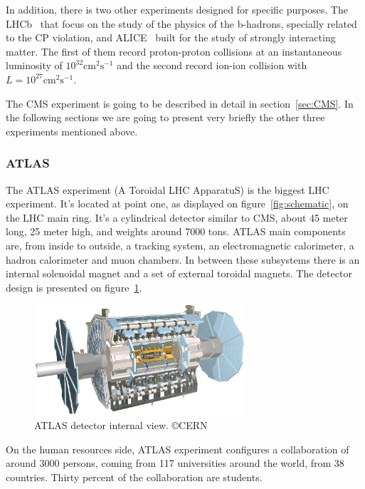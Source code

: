 In addition, there is two other experiments designed for specific purposes. The LHCb~\cite{Alves:2008zz} that focus on the study of the physics of the b-hadrons, specially related to the CP violation, and ALICE~\cite{Cortese:879894} built for the study of strongly interacting matter. The first of them record proton-proton collisions at an instantaneous luminosity of $10^{32}\text{cm}^{2}\text{s}^{-1}$ and the second record ion-ion collision with $L = 10^{27}\text{cm}^{2}\text{s}^{-1}$.

The CMS experiment is going to be described in detail in section~\ref{sec:CMS}. In the following sections we are going to present very briefly the other three experiments mentioned above. 

\subsubsection{ATLAS}
\label{sec:atlas}

The ATLAS experiment (A Toroidal LHC ApparatuS) is the biggest LHC experiment. It's located at point one, as displayed on figure~\ref{fig:schematic}, on the LHC main ring. It's a cylindrical detector similar to CMS, about 45 meter long, 25 meter high, and weights around 7000 tons. ATLAS main components are, from inside to outside, a tracking system, an electromagnetic calorimeter, a hadron calorimeter and muon chambers. In between these subsystems there is an internal solenoidal magnet and a set of external toroidal magnets. The detector design is presented on figure~\ref{fig:atlasdet}.

\begin{figure}[!Hhtbp]
  \begin{center}
    \includegraphics[width=0.7\textwidth]{figs/atlas_lg.jpg}
    \caption{ATLAS detector internal view. \copyright CERN}
    \label{fig:atlasdet}
  \end{center}
\end{figure}

On the human resources side, ATLAS experiment configures a collaboration of around 3000 persons, coming from 117 universities around the world, from 38 countries. Thirty percent of the collaboration are students.  

